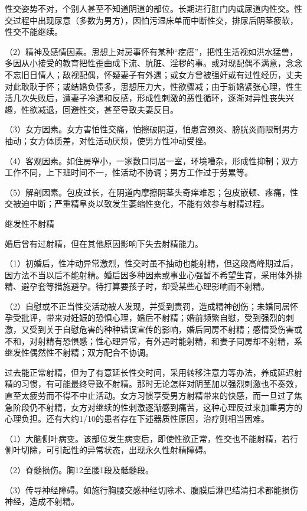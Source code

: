 性交姿势不对，个别人甚至不知道阴道的部位。长期进行肛门内或尿道内性交。性交过程中出现尿意（多数为男方），因怕污湿床单而中断性交，排尿后阴茎疲软，性交不能继续。

（2）精神及感情因素。思想上对房事怀有某种“疙瘩”，把性生活视如洪水猛兽，多因从小接受的教育把性歪曲成下流、肮脏、淫秽的事。或对现配偶不满意，念念不忘旧日情人；敌视配偶，怀疑妻子有外遇；或女方曾被强奸或有过性经历，丈夫对此耿耿于怀；或结婚负债多，思想压力大，性欲骤减；由于新婚紧张心理，性生活几次失败后，遭妻子冷遇和反感，形成性刺激的恶性循环，逐渐对异性丧失兴趣，性欲减退，回避性交，甚至导致夫妻反目。

（3）女方因素。女方害怕性交痛，怕擦破阴道，怕患宫颈炎、膀胱炎而限制男方抽动；女方体质差，对性活动厌烦，使男方性冲动受挫。

（4）客观因素。如住房窄小，一家数口同居一室，环境嘈杂，形成性抑制；双方工作不同，上下班时间不一，性活动不协调；男方工作过于劳累等。

（5）解剖因素。包皮过长，在阴道内摩擦阴茎头奇痒难忍；包皮嵌顿、疼痛，性交被迫中断；严重精阜炎以致发生萎缩性变化，不能有效参与射精过程。

继发性不射精

婚后曾有过射精，但在其他原因影响下失去射精能力。

（1）初婚后，性冲动异常激烈，性交时虽不抽动也能射精，但这段高峰期过后，因方法不当以后不能射精。婚后因多种因素或事业心强暂不希望生育，采用体外排精、避孕套等措施避孕。待打算要孩子时，却受某些心理影响而不射精。

（2）自慰或不正当性交活动被人发现，并受到责罚，造成精神创伤；未婚同居怀孕受批评，带来对妊娠的恐惧心理，婚后不射精；婚前频繁自慰，受到强烈的刺激，又受到关于自慰危害的种种错误宣传的影响，婚后同房不射精；感情受伤害或不和，对射精有恐惧感；性心理异常，有外遇时能射精，和妻子同房却不射精，系继发性偶然性不射精；双方配合不协调。

过去能正常射精，但为了有意延长性交时间，采用转移注意力等办法，养成延迟射精的习惯，有可能最终导致不射精。那时无论怎样对阴茎加以强烈刺激也不奏效，直至太疲劳而不得不中止活动。女方习惯享受男方射精带来的快感，而一旦过了焦急阶段仍不射精，女方对继续的性刺激逐渐感到痛苦，这种心理反过来加重男方的心理负担。还有大约1/10的患者存在下述器质性原因，治疗则相当困难。

（1）大脑侧叶病变。该部位发生病变后，即使性欲正常，性交也不能射精，若行侧叶切除，可引起性的异常状态，出现永久性射精障碍。

（2）脊髓损伤。胸12至腰1段及骶髓段。

（3）传导神经障碍。如施行胸腰交感神经切除术、腹膜后淋巴结清扫术都能损伤神经，造成不射精。

